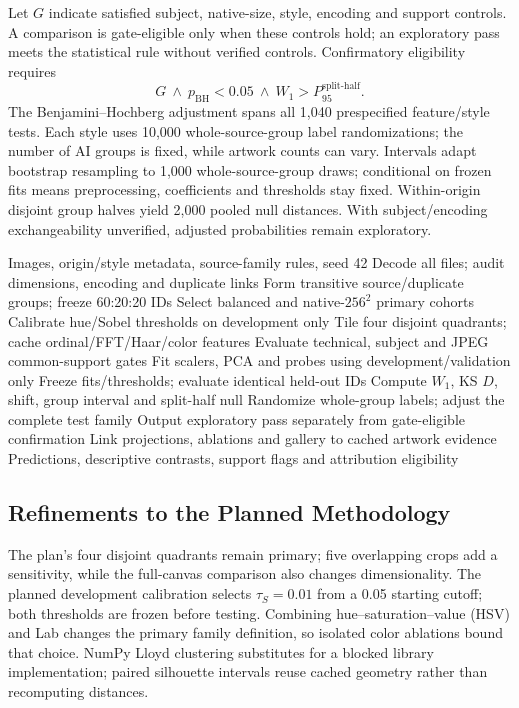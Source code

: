 \documentclass[journal,twoside,web]{IEEEtran}
\begin{document}
Let $G$ indicate satisfied subject, native-size, style, encoding and support controls. A comparison is gate-eligible only when these controls hold; an exploratory pass meets the statistical rule without verified controls. Confirmatory eligibility requires
\begin{equation}
 G\ \wedge\ p_{\mathrm{BH}}<0.05\ \wedge\ W_1>P_{95}^{\mathrm{split\text{-}half}}.
\end{equation}
The Benjamini--Hochberg adjustment \cite{bh} spans all 1,040 prespecified feature/style tests. Each style uses 10,000 whole-source-group label randomizations; the number of AI groups is fixed, while artwork counts can vary. Intervals adapt bootstrap resampling \cite{bootstrap} to 1,000 whole-source-group draws; conditional on frozen fits means preprocessing, coefficients and thresholds stay fixed. Within-origin disjoint group halves yield 2,000 pooled null distances. With subject/encoding exchangeability unverified, adjusted probabilities remain exploratory.
\begin{algorithm}[t]
\caption{Control-gated explainable visual analytics}
\label{alg:pipeline}
\footnotesize\begin{algorithmic}[1]
\Require Images, origin/style metadata, source-family rules, seed 42
\State Decode all files; audit dimensions, encoding and duplicate links
\State Form transitive source/duplicate groups; freeze 60:20:20 IDs
\State Select balanced and native-$256^2$ primary cohorts
\State Calibrate hue/Sobel thresholds on development only
\State Tile four disjoint quadrants; cache ordinal/FFT/Haar/color features
\EndFor
\State Evaluate technical, subject and JPEG common-support gates
\State Fit scalers, PCA and probes using development/validation only
\State Freeze fits/thresholds; evaluate identical held-out IDs
\State Compute $W_1$, KS $D$, shift, group interval and split-half null
\State Randomize whole-group labels; adjust the complete test family
\State Output exploratory pass separately from gate-eligible confirmation
\EndFor
\State Link projections, ablations and gallery to cached artwork evidence
\Ensure Predictions, descriptive contrasts, support flags and attribution eligibility
\end{algorithmic}
\end{algorithm}

\subsection{Refinements to the Planned Methodology}
The plan's four disjoint quadrants remain primary; five overlapping crops add a sensitivity, while the full-canvas comparison also changes dimensionality. The planned development calibration selects $\tau_S=0.01$ from a 0.05 starting cutoff; both thresholds are frozen before testing. Combining hue--saturation--value (HSV) and Lab changes the primary family definition, so isolated color ablations bound that choice. NumPy Lloyd clustering substitutes for a blocked library implementation; paired silhouette intervals reuse cached geometry rather than recomputing distances.
\end{document}
